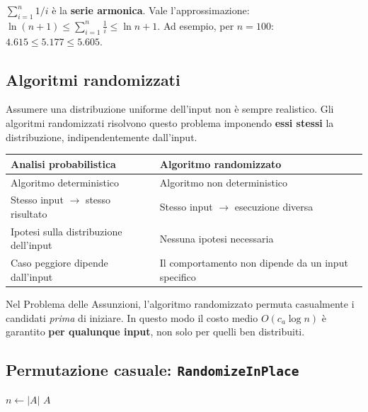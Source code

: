 \begin{nota}
	$\sum_{i=1}^n 1/i$ è la \textbf{serie armonica}. Vale l'approssimazione:
	$\ln(n+1) \le \sum_{i=1}^n \frac{1}{i} \le \ln n + 1.$
	Ad esempio, per $n=100$: $4.615 \le 5.177 \le 5.605$.
\end{nota}

\subsection{Algoritmi randomizzati}

\begin{softnote}
	Assumere una distribuzione uniforme dell'input non è sempre realistico.
	Gli algoritmi randomizzati risolvono questo problema imponendo
	\textbf{essi stessi} la distribuzione, indipendentemente dall'input.
\end{softnote}

\begin{center}
	\begin{tabular}{p{5.5cm}p{5.5cm}}
		\toprule
		\textbf{Analisi probabilistica} & \textbf{Algoritmo randomizzato} \\
		\midrule
		Algoritmo deterministico & Algoritmo non deterministico \\
		Stesso input $\to$ stesso risultato &
		Stesso input $\to$ esecuzione diversa \\
		Ipotesi sulla distribuzione dell'input &
		Nessuna ipotesi necessaria \\
		Caso peggiore dipende dall'input &
		Il comportamento non dipende da un input specifico \\
		\bottomrule
	\end{tabular}
\end{center}

\begin{osservazione}
	Nel Problema delle Assunzioni, l'algoritmo randomizzato permuta
	casualmente i candidati \textit{prima} di iniziare.
	In questo modo il costo medio $O(c_a \log n)$ è garantito
	\textbf{per qualunque input}, non solo per quelli ben distribuiti.
\end{osservazione}

\subsection{Permutazione casuale: \texttt{RandomizeInPlace}}
\begin{algorithm}[H]
	\caption{RandomizeInPlace$(A)$}
	$n \gets |A|$\;
	\Return $A$\;
\end{algorithm}

